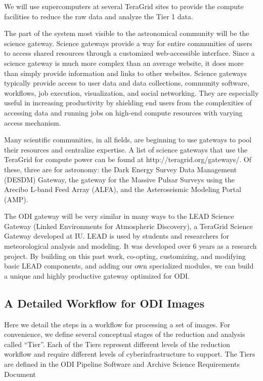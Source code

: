 \documentclass[10pt,conference]{IEEEtran}
\begin{document}
We will use supercomputers at several TeraGrid sites to provide the compute facilities to reduce the raw data and analyze the Tier 1 data. 

The part of the system most visible to the astronomical community will be the science gateway. Science gateways provide a way for entire communities of users to access shared resources through a customized web-accessible interface. Since a science gateway is much more complex than an average website, it does more than simply provide information and links to other websites. Science gateways typically provide access to user data and data collections, community software, workflows, job execution, visualization, and social networking. They are especially useful in increasing productivity by shielding end users from the complexities of accessing data and running jobs on high-end compute resources with varying access mechanism.

Many scientific communities, in all fields, are beginning to use gateways to pool their resources and centralize expertise.  A list of science gateways that use the TeraGrid for compute power can be found at http://teragrid.org/gateways/. Of these, three are for astronomy: the Dark Energy Survey Data Management (DESDM) Gateway, the gateway for the Massive Pulsar Surveys using the Arecibo L-band Feed Array (ALFA), and the Asteroseismic Modeling Portal (AMP).  

The ODI gateway will be very similar in many ways to the LEAD Science Gateway (Linked Environments for Atmospheric Discovery), a TeraGrid Science Gateway developed at IU. LEAD is used by students and researchers for meteorological analysis and modeling. It was developed over 6 years as a research project. By building on this past work, co-opting, customizing, and modifying basic LEAD components, and adding our own specialized modules, we can build a unique and highly productive gateway optimized for ODI.




\subsection{A Detailed Workflow for ODI Images}\label{sec:workflow}

Here we detail the steps in a workflow for processing a set of images. For convenience, we define several conceptual stages of the reduction and analysis called ``Tier''. Each of the Tiers represent different levels of the reduction workflow and require different levels of cyberinfrastructure to support. The Tiers are defined in the ODI Pipeline Software and Archive Science Requirements Document 
\end{document}
